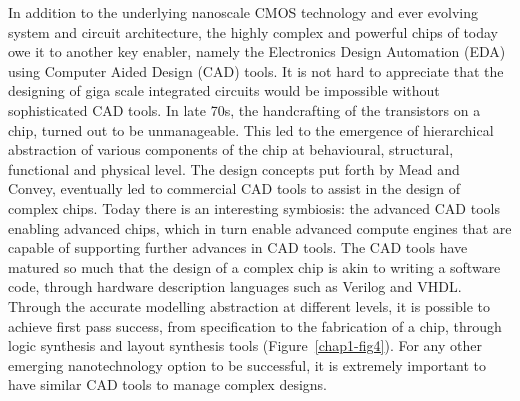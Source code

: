 \begin{multicols}{2}
In addition to the underlying nanoscale CMOS technology and ever evolving system and circuit architecture, the highly complex and powerful chips of today owe it to another key enabler, namely the Electronics Design Automation (EDA) using Computer Aided Design (CAD) tools. It is not hard to appreciate that the designing of giga scale integrated circuits would be impossible without sophisticated CAD tools. In late 70s, the handcrafting of the transistors on a chip, turned out to be unmanageable. This led to the emergence of hierarchical abstraction of various components of the chip at behavioural, structural, functional and physical level. The design concepts put forth by Mead and Convey, eventually led to commercial CAD tools to assist in the design of complex chips. Today there is an interesting symbiosis: the advanced CAD tools enabling advanced chips, which in turn enable advanced compute engines that are capable of supporting further advances in CAD tools. The CAD tools have matured so much that the design of a complex chip is akin to writing a software code, through hardware description languages such as Verilog and VHDL. Through the accurate modelling abstraction at different levels, it is possible to achieve first pass success, from specification to the fabrication of a chip, through logic synthesis and layout synthesis tools (Figure~\ref{chap1-fig4}). For any other emerging nanotechnology option to be  successful, it is extremely important to have similar CAD tools to manage complex designs. 
\end{multicols}

